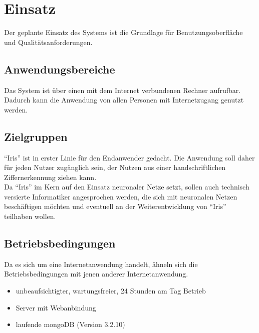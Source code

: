 \section{Einsatz}
Der geplante Einsatz des Systems ist die Grundlage für Benutzungsoberfläche und
Qualitätsanforderungen.
 
\subsection{Anwendungsbereiche}

Das System ist über einen mit dem Internet verbundenen Rechner aufrufbar. Dadurch kann die Anwendung von allen Personen mit Internetzugang genutzt werden.

\subsection{Zielgruppen}

``Iris'' ist in erster Linie für den Endanwender gedacht. Die Anwendung soll daher für jeden Nutzer zugänglich sein, der Nutzen aus einer handschriftlichen Ziffernerkennung ziehen kann.\\
Da ``Iris'' im Kern auf den Einsatz neuronaler Netze setzt, sollen auch technisch versierte Informatiker angesprochen werden, die sich mit neuronalen Netzen beschäftigen möchten und eventuell an der Weiterentwicklung von ``Iris'' teilhaben wollen.

\subsection{Betriebsbedingungen}

Da es sich um eine Internetanwendung handelt, ähneln sich die Betriebsbedingungen mit jenen anderer Internetanwendung.

\begin{itemize}
	\item unbeaufsichtigter, wartungsfreier, 24 Stunden am Tag Betrieb\\[-0.9cm]
	\item Server mit Webanbindung \\[-0.9cm]
	\item laufende mongoDB (Version 3.2.10)
\end{itemize}
